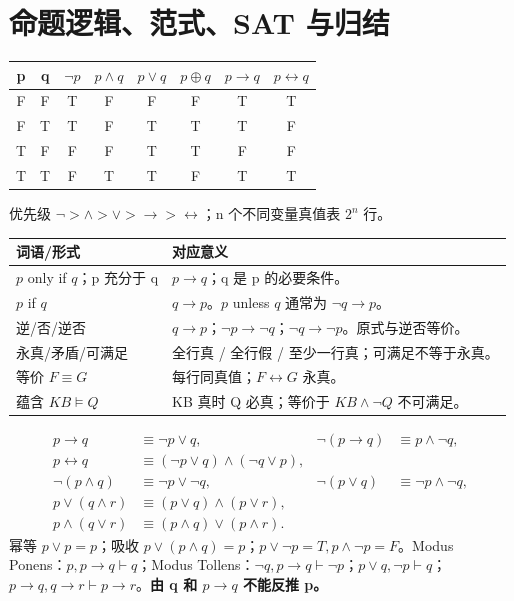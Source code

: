 \section{命题逻辑、范式、SAT 与归结}\label{sec:logic}
\begin{center}\begin{tabular}{cc|cccccc}\toprule
p&q&$\neg p$&$p\land q$&$p\lor q$&$p\oplus q$&$p\to q$&$p\leftrightarrow q$\\\midrule
F&F&T&F&F&F&T&T\\F&T&T&F&T&T&T&F\\T&F&F&F&T&T&F&F\\T&T&F&T&T&F&T&T\\\bottomrule
\end{tabular}\end{center}
优先级 $\neg>\land>\lor>\to>\leftrightarrow$；n 个不同变量真值表 $2^n$ 行。
\par\noindent\begin{tabularx}{\textwidth}{lY}
\toprule 词语/形式 & 对应意义\\\midrule
$p$ only if $q$；p 充分于 q & $p\to q$；q 是 p 的必要条件。\\
$p$ if $q$ & $q\to p$。$p$ unless $q$ 通常为 $\neg q\to p$。\\
逆/否/逆否 & $q\to p$；$\neg p\to\neg q$；$\neg q\to\neg p$。原式与逆否等价。\\
永真/矛盾/可满足 & 全行真 / 全行假 / 至少一行真；可满足不等于永真。\\
等价 $F\equiv G$ & 每行同真值；$F\leftrightarrow G$ 永真。\\
蕴含 $KB\models Q$ & KB 真时 Q 必真；等价于 $KB\land\neg Q$ 不可满足。\\\bottomrule
\end{tabularx}\par

\[
\begin{aligned}
p\to q&\equiv\neg p\lor q,&\neg(p\to q)&\equiv p\land\neg q,\\
p\leftrightarrow q&\equiv(\neg p\lor q)\land(\neg q\lor p),\\
\neg(p\land q)&\equiv\neg p\lor\neg q,&\neg(p\lor q)&\equiv\neg p\land\neg q,\\
p\lor(q\land r)&\equiv(p\lor q)\land(p\lor r),\\
p\land(q\lor r)&\equiv(p\land q)\lor(p\land r).
\end{aligned}
\]
幂等 $p\lor p=p$；吸收 $p\lor(p\land q)=p$；$p\lor\neg p=T,p\land\neg p=F$。Modus Ponens：$p,p\to q\vdash q$；Modus Tollens：$\neg q,p\to q\vdash\neg p$；$p\lor q,\neg p\vdash q$；$p\to q,q\to r\vdash p\to r$。\textbf{由 q 和 $p\to q$ 不能反推 p。}

